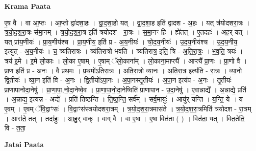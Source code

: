 \documentclass[17pt]{extarticle}
\begin{document}
\textbf{Krama Paata} \newline

ए॒ष वै । वा आ॒प्तः । आ॒प्तो द्वा॑दशा॒हः । द्वा॒द॒शा॒हो यत् । द्वा॒द॒शा॒ह इति॑ द्वादश - अ॒हः । यत् त्र॑योदशरा॒त्रः । त्र॒यो॒द॒श॒रा॒त्रः स॑मा॒नम् । त्र॒यो॒द॒श॒रा॒त्र इति॑ त्रयोदश - रा॒त्रः । स॒मा॒नꣳ हि । ह्ये॑तत् । ए॒तदहः॑ । अह॒र् यत् । यत् प्रा॑य॒णीयः॑ । प्रा॒य॒णीय॑श्च । प्रा॒य॒णीय॒ इति॑ प्र - अ॒य॒नीयः॑ । चो॒द॒य॒नीयः॑ । उ॒द॒य॒नीय॑श्च । उ॒द॒य॒नीय॒ इत्यु॑त् - अ॒य॒नीयः॑ । च॒ त्र्य॑तिरात्रः । त्र्य॑तिरात्रो भवति । त्र्य॑तिरात्र॒ इति॒ त्रि - अ॒ति॒रा॒त्रः॒ । भ॒व॒ति॒ त्रयः॑ । त्रय॑ इ॒मे । इ॒मे लो॒काः । लो॒का ए॒षाम् । ए॒षाम् ॅलो॒काना᳚म् । लो॒काना॒माप्त्यै᳚ । आप्त्यै᳚ प्रा॒णः । प्रा॒णो वै । प्रा॒ण इति॑ प्र - अ॒नः । वै प्र॑थ॒मः । प्र॒थ॒मो॑ऽतिरा॒त्रः । अ॒ति॒रा॒त्रो व्या॒नः । अ॒ति॒रा॒त्र इत्य॑ति - रा॒त्रः । व्या॒नो द्वि॒तीयः॑ । व्या॒न इति॑ वि - अ॒नः । द्वि॒तीयो॑ऽपा॒नः । अ॒पा॒नस्तृ॒तीयः॑ । अ॒पा॒न इत्य॑प - अ॒नः । तृ॒तीयः॑ प्राणापानोदा॒नेषु॑ । प्रा॒णा॒पा॒,नो॒दा॒नेष्वे॒व । प्रा॒णा॒पा॒नो॒दा॒नेष्विति॑ प्राणापान - उ॒दा॒नेषु॑ । ए॒वान्नाद्ये᳚ । अ॒न्नाद्ये॒ प्रति॑ । अ॒न्नाद्य॒ इत्य॑न्न - अद्ये᳚ । प्रति॑ तिष्ठन्ति । ति॒ष्ठ॒न्ति॒ सर्व᳚म् । सर्व॒मायुः॑ । आयु॑र् यन्ति । य॒न्ति॒ ये । य ए॒वम् । ए॒वम् ॅवि॒द्वाꣳसः॑ । वि॒द्वाꣳस॑स्त्रयोदशरा॒त्रम् । त्र॒यो॒द॒श॒रा॒त्रमास॑ते । त्र॒यो॒द॒श॒रा॒त्रमिति॑ त्रयोदश - रा॒त्रम् । आस॑ते॒ तत् । तदा॑हुः । आ॒हु॒र् वाक् । वाग् वै । वा ए॒षा । ए॒षा वित॑ता ( ) । वित॑ता॒ यत् । वित॒तेति॒ वि - त॒ता॒ \newline

\textbf{Jatai Paata} \newline
\end{document}
